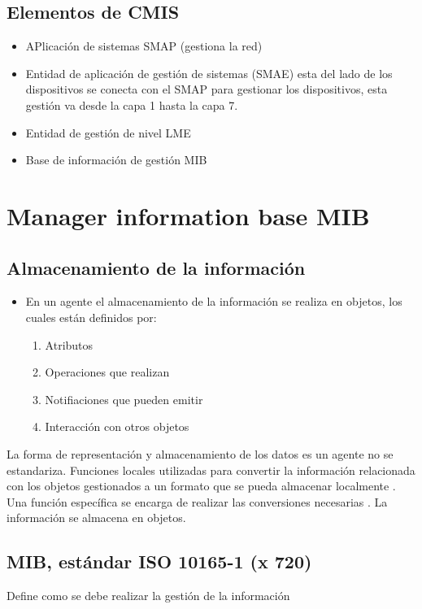 \subsection{Elementos de CMIS}
\begin{itemize}
    \item {APlicación de sistemas SMAP (gestiona la red)}
    \item {Entidad de aplicación de gestión de sistemas (SMAE) esta del lado de los dispositivos se conecta con el SMAP para gestionar los dispositivos, esta gestión va desde la capa 1 hasta la capa 7.}
    \item {Entidad de gestión de nivel LME }
    \item {Base de información de gestión MIB }
\end{itemize}

\section{Manager information base MIB}
\subsection{Almacenamiento de la información}

\begin{itemize}
    \item {En un agente el almacenamiento de la información se realiza en objetos, los cuales están definidos por:
        \begin{enumerate}
            \item {Atributos}
            \item {Operaciones que realizan}
            \item {Notifiaciones que pueden emitir}
            \item {Interacción con otros objetos}
        \end{enumerate}
    }
\end{itemize}

La forma de representación y almacenamiento de los datos es un agente no se estandariza.
Funciones locales utilizadas para convertir la información relacionada con los objetos gestionados a un formato que se pueda almacenar localmente .
Una función específica se encarga de realizar las conversiones necesarias .
La información se almacena en objetos.

\subsection{MIB, estándar ISO 10165-1 (x 720)}
Define como se debe realizar la gestión de la información 


